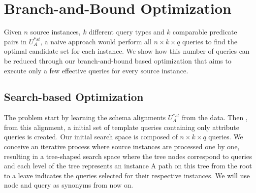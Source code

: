 \section{Branch-and-Bound Optimization}


Given $n$ source instances, $k$ different query types and $k$ comparable predicate pairs in $U^{*st}_A$, a naive approach would perform all $n \times k \times q$ queries to find the optimal candidate set for each instance. We show how this number of queries can be reduced through our branch-and-bound based optimization that aims to execute only a few effective queries for every source instance. 
 
\subsection{Search-based Optimization} 
The problem start by learning the schema alignments $U^{*st}_A$ from the data. Then , from this alignment, a initial set of template queries containing only attribute queries is created. Our initial search space is composed of $n \times k \times q$ queries. We conceive an iterative process where source instances are processed one by one, resulting in a tree-shaped search space where the tree nodes correspond to queries and each level of the tree represents an instance  A path on this tree from the root to a leave indicates the queries selected for their respective instances. We will use node and query as synonyms from now on.

